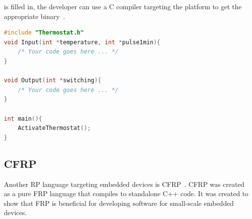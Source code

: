 \documentclass[a4paper]{book}
\begin{document}
is filled in, the developer can use a C compiler targeting the platform to get
the appropriate binary~\cite{sawada2016emfrp}.
\begin{listing}[ht]
	\begin{lstlisting}[language=c]
#include "Thermostat.h"
void Input(int *temperature, int *pulse1min){
    /* Your code goes here ... */
}

void Output(int *switching){
    /* Your code goes here ... */
}

int main(){
    ActivateThermostat();
}\end{lstlisting}
	\caption{I/O Code Skeleton for Thermostat~\cite{sawada2016emfrp}}
	\label{lst:io-code-skeleton-for-thermostat}
\end{listing}
\subsection{CFRP}
\label{sec:cfrp}
Another RP language targeting embedded devices is
CFRP~\cite{suzuki_cfrp_embedded}. CFRP was created as a pure FRP language that
compiles to standalone C++ code. It was created to show that FRP is beneficial
for developing software for small-scale embedded devices.
\end{document}
